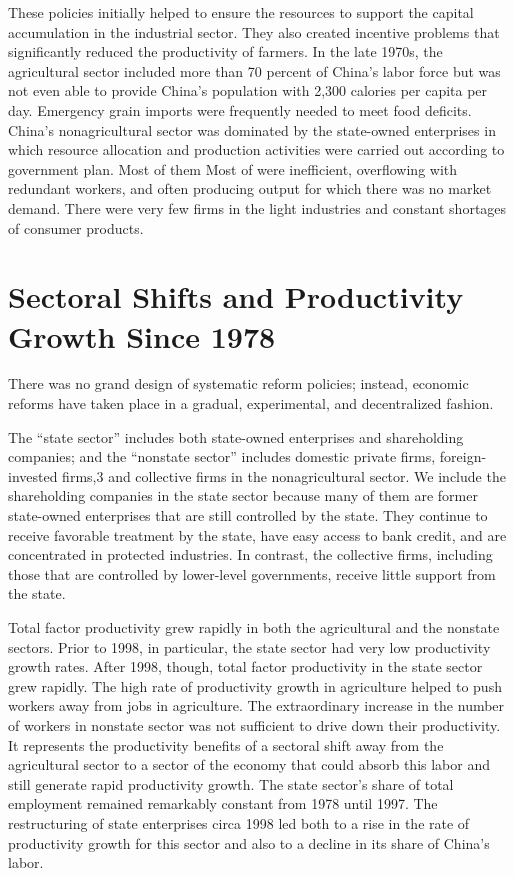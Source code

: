 \documentclass{article}
\begin{document}
    These policies initially helped to ensure the resources to support the capital accumulation in the industrial sector. They also created incentive problems that significantly reduced the productivity of farmers. In the late 1970s, the agricultural sector included more than 70 percent of China’s labor force but was not even able to provide China’s population with 2,300 calories per capita per day. Emergency grain imports were frequently needed to meet food deficits. China’s nonagricultural sector was dominated by the state-owned enterprises in which resource allocation and production activities were carried out according to government plan. Most of them Most of were inefficient, overflowing with redundant workers, and often producing output for which there was no market demand. There were very few firms in the light industries and constant shortages of consumer products.

    \section*{Sectoral Shifts and Productivity Growth Since 1978}
    There was no grand design of systematic reform policies; instead, economic reforms have taken place in a gradual, experimental, and decentralized fashion.

    The “state sector” includes both state-owned enterprises and shareholding companies; and the “nonstate sector” includes domestic private firms, foreign-invested firms,3 and collective firms in the nonagricultural sector. We include the shareholding companies in the state sector because many of them are former state-owned enterprises that are still controlled by the state. They continue to receive favorable treatment by the state, have easy access to bank credit, and are concentrated in protected industries. In contrast, the collective firms, including those that are controlled by lower-level governments, receive little support from the state.

    Total factor productivity grew rapidly in both the agricultural and the nonstate sectors. Prior to 1998, in particular, the state sector had very low productivity growth rates. After 1998, though, total factor productivity in the state sector grew rapidly. The high rate of productivity growth in agriculture helped to push workers away from jobs in agriculture. The extraordinary increase in the number of workers in nonstate sector was not sufficient to drive down their productivity. It represents the productivity benefits of a sectoral shift away from the agricultural sector to a sector of the economy that could absorb this labor and still generate rapid productivity growth. The state sector’s share of total employment remained remarkably constant from 1978 until 1997. The restructuring of state enterprises circa 1998 led both to a rise in the rate of productivity growth for this sector and also to a decline in its share of China’s labor.
    
\end{document}
